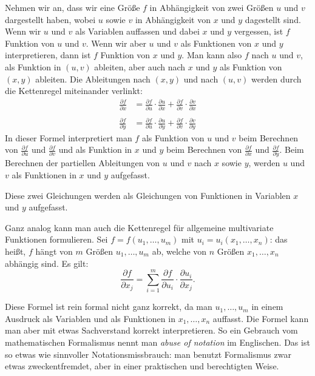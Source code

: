 \begin{bem}
	Nehmen wir an, dass wir eine Größe $f$ in Abhängigkeit von zwei Größen $u$ und $v$ dargestellt haben, wobei $u$ sowie $v$ in Abhängigkeit von $x$ und $y$ dagestellt sind. Wenn wir $u$ und $v$ als Variablen auffassen und dabei $x$ und $y$ vergessen, ist $f$ Funktion von $u$ und $v$. Wenn wir aber $u$ und $v$ als Funktionen von $x$ und $y$ interpretieren, dann ist $f$ Funktion von $x$ und $y$. Man kann also $f$ nach $u$ und $v$, als Funktion in $(u,v)$ ableiten, aber auch nach $x$ und $y$ als Funktion von $(x,y)$ ableiten. Die Ableitungen nach $(x,y)$ und nach $(u,v)$ werden durch die Kettenregel  miteinander verlinkt: 
	\begin{align*}
		\frac{\partial f}{\partial x}  & = \frac{\partial f}{\partial u} \cdot \frac{\partial u}{\partial x} + \frac{\partial f}{\partial v} \cdot \frac{\partial v}{\partial x}
		\\
	\\ \frac{\partial f}{\partial y}  & = \frac{\partial f}{\partial u} \cdot \frac{\partial u}{\partial y} + \frac{\partial f}{\partial v} \cdot \frac{\partial v}{\partial y}
	\end{align*} 
	In dieser Formel interpretiert man $f$ als Funktion von $u$ und $v$ beim Berechnen von $\frac{\partial f}{\partial u}$ und $\frac{\partial f}{\partial v}$ und als Funktion in $x$ und $y$ beim Berechnen von $\frac{\partial f}{\partial x}$ und $\frac{\partial f}{\partial y}$. Beim Berechnen der partiellen Ableitungen von $u$ und $v$ nach $x$ sowie $y$, werden $u$ und $v$ als Funktionen in $x$ und $y$ aufgefasst. 
	
	Diese zwei Gleichungen werden als Gleichungen von Funktionen in Variablen $x$ und $y$ aufgefasst. 
\end{bem} 

\begin{bem}
	Ganz analog kann man auch die Kettenregel für allgemeine multivariate Funktionen formulieren. Sei $f = f(u_1,\ldots,u_m)$ mit $u_i = u_i(x_1,\ldots,x_n)$: das heißt, $f$ hängt von $m$ Größen $u_1,\ldots,u_m$ ab, welche von $n$ Größen $x_1,\ldots,x_n$ abhängig sind. Es gilt: 
\[
\frac{\partial f}{\partial x_j} = \sum_{i=1}^m \frac{\partial f}{\partial u_i} \cdot \frac{\partial u_i}{\partial x_j}. 
\]

Diese Formel ist rein formal nicht ganz korrekt, da man $u_1,\ldots,u_m$ in einem Ausdruck als Variablen und als Funktionen in $x_1,\ldots,x_n$ auffasst. Die Formel kann man aber mit etwas Sachverstand korrekt interpretieren. So ein Gebrauch vom mathematischen Formalismus nennt man \emph{abuse of notation} im Englischen. Das ist so etwas wie sinnvoller Notationsmissbrauch: man benutzt Formalismus zwar etwas zweckentfremdet, aber in einer praktischen und berechtigten Weise.  
\end{bem} 

